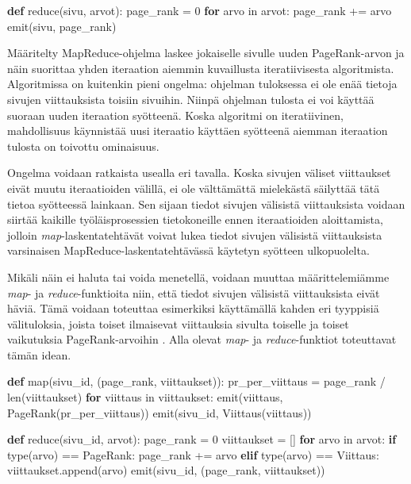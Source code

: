\documentclass[finnish]{templates/tktltiki2}
\newenvironment{Shaded}{}{}
\newcommand{\KeywordTok}[1]{\textcolor[rgb]{0.00,0.44,0.13}{\textbf{{#1}}}}
\newcommand{\DataTypeTok}[1]{\textcolor[rgb]{0.56,0.13,0.00}{{#1}}}
\newcommand{\DecValTok}[1]{\textcolor[rgb]{0.25,0.63,0.44}{{#1}}}
\newcommand{\NormalTok}[1]{{#1}}
\theoremstyle{definition}
\theoremstyle{remark}
\begin{document}
\begin{Shaded}
\begin{Highlighting}[]
\KeywordTok{def} \DataTypeTok{reduce}\NormalTok{(sivu, arvot):}
    \NormalTok{page_rank = }\DecValTok{0}
    \KeywordTok{for} \NormalTok{arvo in arvot:}
        \NormalTok{page_rank += arvo}
    \NormalTok{emit(sivu, page_rank)}
\end{Highlighting}
\end{Shaded}

Määritelty MapReduce-ohjelma laskee jokaiselle sivulle uuden
PageRank-arvon ja näin suorittaa yhden iteraation aiemmin kuvaillusta
iteratiivisesta algoritmista. Algoritmissa on kuitenkin pieni ongelma:
ohjelman tuloksessa ei ole enää tietoja sivujen viittauksista toisiin
sivuihin. Niinpä ohjelman tulosta ei voi käyttää suoraan uuden
iteraation syötteenä. Koska algoritmi on iteratiivinen, mahdollisuus
käynnistää uusi iteraatio käyttäen syötteenä aiemman iteraation tulosta
on toivottu ominaisuus.

Ongelma voidaan ratkaista usealla eri tavalla. Koska sivujen väliset
viittaukset eivät muutu iteraatioiden välillä, ei ole välttämättä
mielekästä säilyttää tätä tietoa syötteessä lainkaan. Sen sijaan tiedot
sivujen välisistä viittauksista voidaan siirtää kaikille
työläisprosessien tietokoneille ennen iteraatioiden aloittamista,
jolloin \emph{map}-laskentatehtävät voivat lukea tiedot sivujen
välisistä viittauksista varsinaisen MapReduce-laskentatehtävässä
käytetyn syötteen ulkopuolelta.

Mikäli näin ei haluta tai voida menetellä, voidaan muuttaa
määrittelemiämme \emph{map}- ja \emph{reduce}-funktioita niin, että
tiedot sivujen välisistä viittauksista eivät häviä. Tämä voidaan
toteuttaa esimerkiksi käyttämällä kahden eri tyyppisiä välituloksia,
joista toiset ilmaisevat viittauksia sivulta toiselle ja toiset
vaikutuksia PageRank-arvoihin \cite{pagerank-mapreduce}. Alla olevat
\emph{map}- ja \emph{reduce}-funktiot toteuttavat tämän idean.

\begin{Shaded}
\begin{Highlighting}[]
\KeywordTok{def} \DataTypeTok{map}\NormalTok{(sivu_id, (page_rank, viittaukset)):}
    \NormalTok{pr_per_viittaus = page_rank / }\DataTypeTok{len}\NormalTok{(viittaukset)}
    \KeywordTok{for} \NormalTok{viittaus in viittaukset:}
        \NormalTok{emit(viittaus, PageRank(pr_per_viittaus))}
        \NormalTok{emit(sivu_id, Viittaus(viittaus))}

\KeywordTok{def} \DataTypeTok{reduce}\NormalTok{(sivu_id, arvot):}
    \NormalTok{page_rank = }\DecValTok{0}
    \NormalTok{viittaukset = []}
    \KeywordTok{for} \NormalTok{arvo in arvot:}
        \KeywordTok{if} \DataTypeTok{type}\NormalTok{(arvo) == PageRank:}
            \NormalTok{page_rank += arvo}
        \KeywordTok{elif} \DataTypeTok{type}\NormalTok{(arvo) == Viittaus:}
            \NormalTok{viittaukset.append(arvo)}
    \NormalTok{emit(sivu_id, (page_rank, viittaukset))}
\end{Highlighting}
\end{Shaded}
\end{document}
